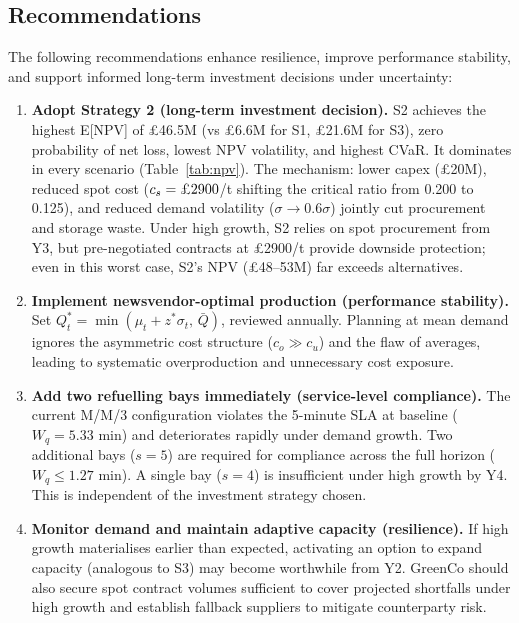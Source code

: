 \documentclass[10pt,a4paper]{article}
\begin{document}
\subsection{Recommendations}

The following recommendations enhance resilience, improve performance stability, and support informed long-term investment decisions under uncertainty:

\begin{enumerate}
    \item \textbf{Adopt Strategy 2 (long-term investment decision).} S2 achieves the highest E[NPV] of \pounds46.5M (vs \pounds6.6M for S1, \pounds21.6M for S3), zero probability of net loss, lowest NPV volatility, and highest CVaR. It dominates in every scenario (Table~\ref{tab:npv}). The mechanism: lower capex (\pounds20M), reduced spot cost ($c_s = \text{\pounds}2900$/t shifting the critical ratio from 0.200 to 0.125), and reduced demand volatility ($\sigma \to 0.6\sigma$) jointly cut procurement and storage waste. Under high growth, S2 relies on spot procurement from Y3, but pre-negotiated contracts at \pounds2900/t provide downside protection; even in this worst case, S2's NPV (\pounds48--53M) far exceeds alternatives.

    \item \textbf{Implement newsvendor-optimal production (performance stability).} Set $Q_t^* = \min(\mu_t + z^*\sigma_t,\,\bar{Q})$, reviewed annually. Planning at mean demand ignores the asymmetric cost structure ($c_o \gg c_u$) and the flaw of averages, leading to systematic overproduction and unnecessary cost exposure.

    \item \textbf{Add two refuelling bays immediately (service-level compliance).} The current M/M/3 configuration violates the 5-minute SLA at baseline ($W_q = 5.33$ min) and deteriorates rapidly under demand growth. Two additional bays ($s = 5$) are required for compliance across the full horizon ($W_q \leq 1.27$ min). A single bay ($s = 4$) is insufficient under high growth by Y4. This is independent of the investment strategy chosen.

    \item \textbf{Monitor demand and maintain adaptive capacity (resilience).} If high growth materialises earlier than expected, activating an option to expand capacity (analogous to S3) may become worthwhile from Y2. GreenCo should also secure spot contract volumes sufficient to cover projected shortfalls under high growth and establish fallback suppliers to mitigate counterparty risk.
\end{enumerate}
\end{document}
